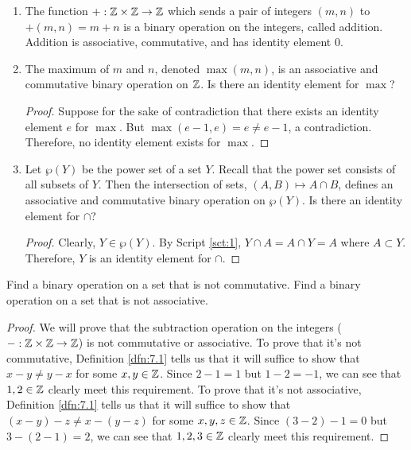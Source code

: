 \documentclass[../main.tex]{subfiles}
\begin{document}
\begin{examples}\label{xml:7.4}\leavevmode
    \begin{enumerate}
        \item The function $+:\mathbb{Z}\times\mathbb{Z}\to\mathbb{Z}$ which sends a pair of integers $(m,n)$ to $+(m,n)=m+n$ is a binary operation on the integers, called addition. Addition is associative, commutative, and has identity element 0.
        \item The maximum of $m$ and $n$, denoted $\max(m,n)$, is an associative and commutative binary operation on $\mathbb{Z}$. Is there an identity element for $\max$?
        \begin{proof}
            Suppose for the sake of contradiction that there exists an identity element $e$ for $\max$. But $\max(e-1,e)=e\neq e-1$, a contradiction. Therefore, no identity element exists for $\max$.
        \end{proof}
        \item Let $\wp(Y)$ be the power set of a set $Y$. Recall that the power set consists of all subsets of $Y$. Then the intersection of sets, $(A,B)\mapsto A\cap B$, defines an associative and commutative binary operation on $\wp(Y)$. Is there an identity element for $\cap$?
        \begin{proof}
            Clearly, $Y\in\wp(Y)$. By Script \ref{sct:1}, $Y\cap A=A\cap Y=A$ where $A\subset Y$. Therefore, $Y$ is an identity element for $\cap$.
        \end{proof}
    \end{enumerate}
\end{examples}

\begin{exercise}\label{exr:7.5}
    Find a binary operation on a set that is not commutative. Find a binary operation on a set that is not associative.
    \begin{proof}
        We will prove that the subtraction operation on the integers ($-:\mathbb{Z}\times\mathbb{Z}\to\mathbb{Z}$) is not commutative or associative. To prove that it's not commutative, Definition \ref{dfn:7.1} tells us that it will suffice to show that $x-y\neq y-x$ for some $x,y\in\mathbb{Z}$. Since $2-1=1$ but $1-2=-1$, we can see that $1,2\in\mathbb{Z}$ clearly meet this requirement. To prove that it's not associative, Definition \ref{dfn:7.1} tells us that it will suffice to show that $(x-y)-z\neq x-(y-z)$ for some $x,y,z\in\mathbb{Z}$. Since $(3-2)-1=0$ but $3-(2-1)=2$, we can see that $1,2,3\in\mathbb{Z}$ clearly meet this requirement.
    \end{proof}
\end{exercise}
\end{document}
